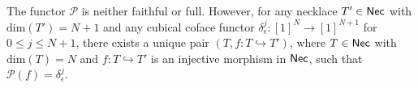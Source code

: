\begin{remark}
The functor $\mathcal{P}$ is neither faithful or full. However, for any necklace $T' \in \mathsf{Nec}$ with $\text{dim}(T')=N+1$ and any cubical coface functor $\delta_{\epsilon}^j: [1]^N \to [1]^{N+1}$ for $0 \leq j \leq N+1$, there exists a unique pair $(T, f: T \hookrightarrow T')$, where $T \in \mathsf{Nec}$ with $\text{dim}(T)=N$ and $f: T \hookrightarrow T'$ is an injective morphism in $\mathsf{Nec}$, such that $\mathcal{P}(f)=\delta_{\epsilon}^j $.
\end{remark}
